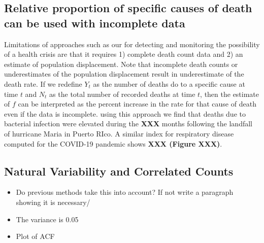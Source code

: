 \documentclass[11pt]{article}
\begin{document}

\subsection{Relative proportion of specific causes of death can be used with incomplete data}
\label{subsec:causes-deaths}
Limitations of approaches such as our for detecting and monitoring the possibility of a health crisis are that it requires 1) complete death count data and 2) an estimate of population displacement. Note that incomplete death counts or underestimates of the population displacement result in underestimate of the death rate. If we redefine $Y_t$ as the number of deaths do to a specific cause at time $t$ and $N_t$ as the total number of recorded deaths at time $t$, then the estimate of $f$ can be interpreted as the percent increase in the rate for that cause of death even if the data is incomplete. using this approach we find that deaths due to bacterial infection were elevated during the \textbf{XXX} months following the landfall of hurricane Maria in Puerto RIco. A similar index for respiratory disease computed for the COVID-19 pandemic shows \textbf{XXX (Figure XXX)}.

\subsection{Natural Variability and Correlated Counts}
\label{subsec:natural-variability}
\begin{itemize}
Need to finish this section
    \item Do previous methods take this into account? If not write a paragraph showing it is necessary/
    \item The variance is 0.05
    \item Plot of ACF
\end{itemize}
\end{document}
